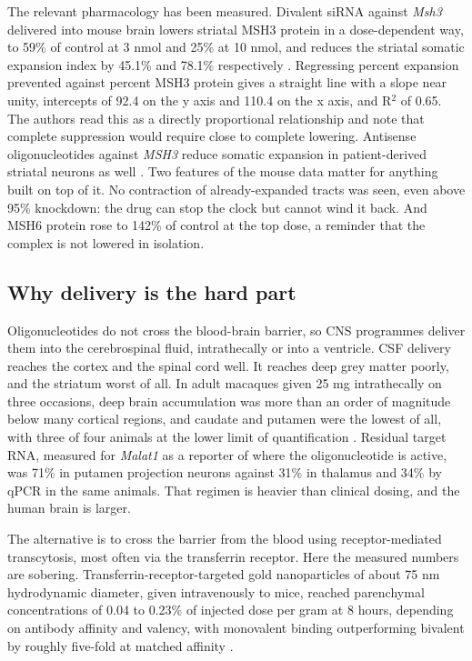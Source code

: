 \documentclass[conference]{IEEEtran}
\begin{document}
The relevant pharmacology has been measured. Divalent siRNA against \textit{Msh3} delivered into mouse brain lowers striatal MSH3 protein in a dose-dependent way, to 59\% of control at 3 nmol and 25\% at 10 nmol, and reduces the striatal somatic expansion index by 45.1\% and 78.1\% respectively \cite{disirna}. Regressing percent expansion prevented against percent MSH3 protein gives a straight line with a slope near unity, intercepts of 92.4 on the y axis and 110.4 on the x axis, and R$^{2}$ of 0.65. The authors read this as a directly proportional relationship and note that complete suppression would require close to complete lowering. Antisense oligonucleotides against \textit{MSH3} reduce somatic expansion in patient-derived striatal neurons as well \cite{aso}. Two features of the mouse data matter for anything built on top of it. No contraction of already-expanded tracts was seen, even above 95\% knockdown: the drug can stop the clock but cannot wind it back. And MSH6 protein rose to 142\% of control at the top dose, a reminder that the complex is not lowered in isolation.

\subsection{Why delivery is the hard part}
\label{sec:1.5}
Oligonucleotides do not cross the blood-brain barrier, so CNS programmes deliver them into the cerebrospinal fluid, intrathecally or into a ventricle. CSF delivery reaches the cortex and the spinal cord well. It reaches deep grey matter poorly, and the striatum worst of all. In adult macaques given 25 mg intrathecally on three occasions, deep brain accumulation was more than an order of magnitude below many cortical regions, and caudate and putamen were the lowest of all, with three of four animals at the lower limit of quantification \cite{frei}. Residual target RNA, measured for \textit{Malat1} as a reporter of where the oligonucleotide is active, was 71\% in putamen projection neurons against 31\% in thalamus and 34\% by qPCR in the same animals. That regimen is heavier than clinical dosing, and the human brain is larger.

The alternative is to cross the barrier from the blood using receptor-mediated transcytosis, most often via the transferrin receptor. Here the measured numbers are sobering. Transferrin-receptor-targeted gold nanoparticles of about 75 nm hydrodynamic diameter, given intravenously to mice, reached parenchymal concentrations of 0.04 to 0.23\% of injected dose per gram at 8 hours, depending on antibody affinity and valency, with monovalent binding outperforming bivalent by roughly five-fold at matched affinity \cite{johnsen}.
\end{document}
